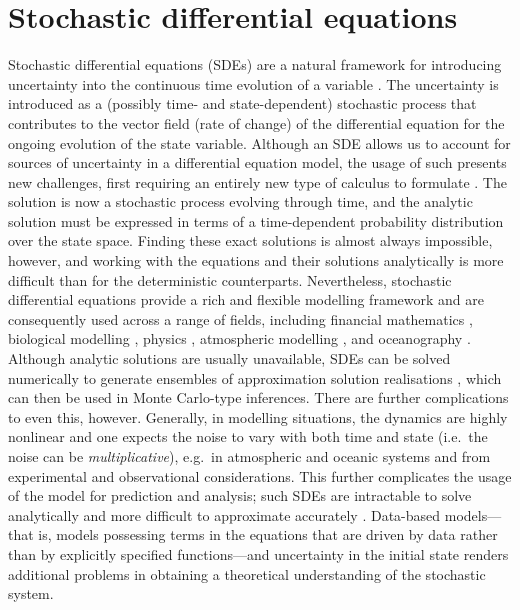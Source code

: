 \section{Stochastic differential equations}
Stochastic differential equations (SDEs) are a natural framework for introducing uncertainty into the continuous time evolution of a variable \citep{Oksendal_2003_StochasticDifferentialEquations,SarkkaSolin_2019_AppliedStochasticDifferential,KallianpurSundar_2014_StochasticAnalysisDiffusion,Penland_2003_StochasticApproachNonlinear}.
The uncertainty is introduced as a (possibly time- and state-dependent) stochastic process that contributes to the vector field (rate of change) of the differential equation for the ongoing evolution of the state variable.
Although an SDE allows us to account for sources of uncertainty in a differential equation model, the usage of such presents new challenges, first requiring an entirely new type of calculus to formulate \citep{Ito_1944_StochasticIntegral,Ito_1946_StochasticIntegralEquation}.
The solution is now a stochastic process evolving through time, and the analytic solution must be expressed in terms of a time-dependent probability distribution over the state space.
Finding these exact solutions is almost always impossible, however, and working with the equations and their solutions analytically is more difficult than for the deterministic counterparts.
Nevertheless, stochastic differential equations provide a rich and flexible modelling framework and are consequently used across a range of fields, including financial mathematics \citep{KabanovEtAl_2006_StochasticCalculusMathematical}, biological modelling \citep[e.g.]{PreislerEtAl_2004_ModelingAnimalMovements,BacharEtAl_2013_StochasticBiomathematicalModels}, physics \citep[e.g.]{StraussEffenberger_2017_HitchhikerGuideStochastic,GardinerEtAl_1992_WavefunctionQuantumStochastic}, atmospheric modelling \citep{WilsonSawford_1996_ReviewLagrangianStochastic}, and oceanography \citep{BerloffMcWilliams_2002_MaterialTransportOceanic}.
Although analytic solutions are usually unavailable, SDEs can be solved numerically to generate ensembles of approximation solution realisations \citep{KloedenPlaten_1992_NumericalSolutionStochastic}, which can then be used in Monte Carlo-type inferences.
There are further complications to even this, however.
Generally, in modelling situations, the dynamics are highly nonlinear and one expects the noise to vary with both time and state (i.e.\ the noise can be \emph{multiplicative}), e.g.\ in atmospheric \citep{SuraEtAl_2005_MultiplicativeNoiseNonGaussianity,Sura_2003_StochasticAnalysisSouthern} and oceanic \citep{KamenkovichEtAl_2015_PropertiesOriginsAnisotropic} systems and from experimental and observational considerations.
This further complicates the usage of the model for prediction and analysis; such SDEs are intractable to solve analytically and more difficult to approximate accurately \citep{MoraEtAl_2017_StableNumericalScheme,SanchoEtAl_1982_AnalyticalNumericalStudies}.
Data-based models---that is, models possessing terms in the equations that are driven by data rather than by explicitly specified functions---and uncertainty in the initial state renders additional problems in obtaining a theoretical understanding of the stochastic system.

